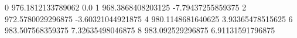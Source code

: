 0 976.1812133789062 0.0
1 968.3868408203125 -7.79437255859375
2 972.5780029296875 -3.60321044921875
4 980.1148681640625 3.93365478515625
6 983.507568359375 7.32635498046875
8 983.092529296875 6.91131591796875

